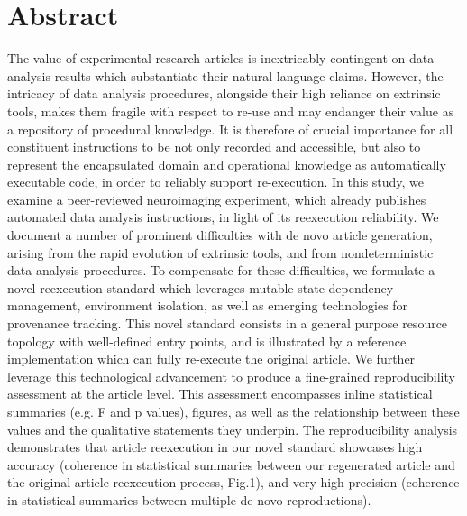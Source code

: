 \section{Abstract}

The value of experimental research articles is inextricably contingent on data analysis results which substantiate their natural language claims.
However, the intricacy of data analysis procedures, alongside their high reliance on extrinsic tools, makes them fragile with respect to re-use and may endanger their value as a repository of procedural knowledge.
It is therefore of crucial importance for all constituent instructions to be not only recorded and accessible, but also to represent the encapsulated domain and operational knowledge as automatically executable code, in order to reliably support re-execution.
In this study, we examine a peer-reviewed neuroimaging experiment, which already publishes automated data analysis instructions, in light of its reexecution reliability.
We document a number of prominent difficulties with de novo article generation, arising from the rapid evolution of extrinsic tools, and from nondeterministic data analysis procedures.
To compensate for these difficulties, we formulate a novel reexecution standard which leverages mutable-state dependency management, environment isolation, as well as emerging technologies for provenance tracking.
This novel standard consists in a general purpose resource topology with well-defined entry points, and is illustrated by a reference implementation which can fully re-execute the original article.
We further leverage this technological advancement to produce a fine-grained reproducibility assessment at the article level.
This assessment encompasses inline statistical summaries (e.g. F and p values), figures, as well as the relationship between these values and the qualitative statements they underpin.
The reproducibility analysis demonstrates that article reexecution in our novel standard showcases high accuracy (coherence in statistical summaries between our regenerated article and the original article reexecution process, Fig.1), and very high precision (coherence in statistical summaries between multiple de novo reproductions).

